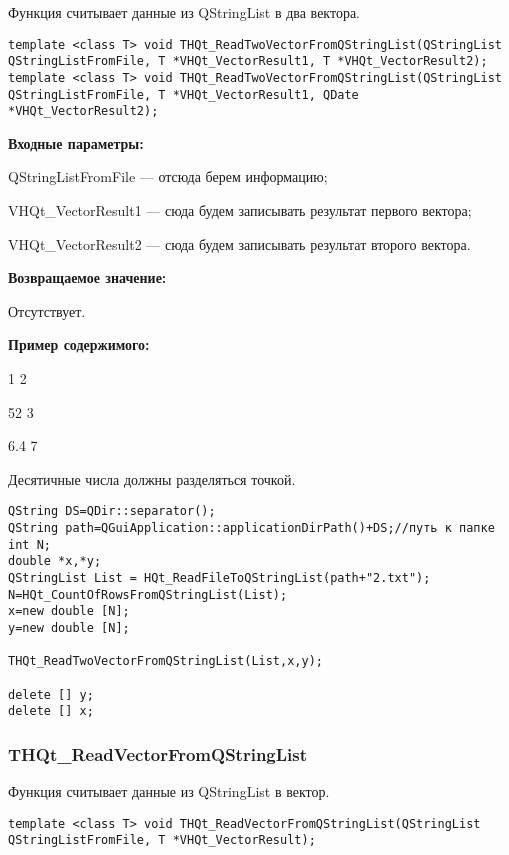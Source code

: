 \documentclass[a4paper,12pt]{article}
\begin{document}
Функция считывает данные из QStringList в два вектора.


\begin{lstlisting}[label=code_syntax_THQt_ReadTwoVectorFromQStringList,caption=Синтаксис]
template <class T> void THQt_ReadTwoVectorFromQStringList(QStringList QStringListFromFile, T *VHQt_VectorResult1, T *VHQt_VectorResult2);
template <class T> void THQt_ReadTwoVectorFromQStringList(QStringList QStringListFromFile, T *VHQt_VectorResult1, QDate *VHQt_VectorResult2);
\end{lstlisting}

\textbf{Входные параметры:}
 
QStringListFromFile --- отсюда берем информацию;
 
    VHQt\_VectorResult1 --- сюда будем записывать результат первого вектора;
 
    VHQt\_VectorResult2 --- сюда будем записывать результат второго вектора.

\textbf{Возвращаемое значение:}

Отсутствует.

\textbf{Пример содержимого:}

1	2

52	3

6.4	7

Десятичные числа должны разделяться точкой.


\begin{lstlisting}[label=code_use_THQt_ReadTwoVectorFromQStringList,caption=Пример использования]
QString DS=QDir::separator();
QString path=QGuiApplication::applicationDirPath()+DS;//путь к папке
int N;
double *x,*y;
QStringList List = HQt_ReadFileToQStringList(path+"2.txt");
N=HQt_CountOfRowsFromQStringList(List);
x=new double [N];
y=new double [N];

THQt_ReadTwoVectorFromQStringList(List,x,y);

delete [] y;
delete [] x;
\end{lstlisting}

\subsubsection{THQt\_ReadVectorFromQStringList}\label{THQt_ReadVectorFromQStringList}

Функция считывает данные из QStringList в вектор.


\begin{lstlisting}[label=code_syntax_THQt_ReadVectorFromQStringList,caption=Синтаксис]
template <class T> void THQt_ReadVectorFromQStringList(QStringList QStringListFromFile, T *VHQt_VectorResult);
\end{lstlisting}
\end{document}
